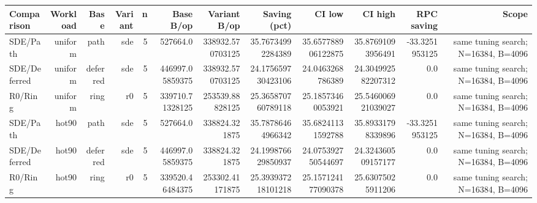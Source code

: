 \begin{tabular}{lrrrrrrrrrrr}
\toprule
Comparison & Workload & Base & Variant & n & Base B/op & Variant B/op & Saving (pct) & CI low & CI high & RPC saving & Scope \\
\midrule
SDE/Path & uniform & path & sde & 5 & 527664.0 & 338932.570703125 & 35.76734992284389 & 35.657788906122875 & 35.87691093956491 & -33.3251953125 & same tuning search; N=16384, B=4096 \\
SDE/Deferred & uniform & deferred & sde & 5 & 446997.05859375 & 338932.570703125 & 24.175659730423106 & 24.0463268786389 & 24.304992582207312 & 0.0 & same tuning search; N=16384, B=4096 \\
R0/Ring & uniform & ring & r0 & 5 & 339710.71328125 & 253539.88828125 & 25.365870760789118 & 25.18573460053921 & 25.546006921039027 & 0.0 & same tuning search; N=16384, B=4096 \\
SDE/Path & hot90 & path & sde & 5 & 527664.0 & 338824.321875 & 35.78786464966342 & 35.68241131592788 & 35.89331798339896 & -33.3251953125 & same tuning search; N=16384, B=4096 \\
SDE/Deferred & hot90 & deferred & sde & 5 & 446997.05859375 & 338824.321875 & 24.199876629850937 & 24.075392750544697 & 24.324360509157177 & 0.0 & same tuning search; N=16384, B=4096 \\
R0/Ring & hot90 & ring & r0 & 5 & 339520.46484375 & 253302.41171875 & 25.393937218101218 & 25.157124177090378 & 25.63075025911206 & 0.0 & same tuning search; N=16384, B=4096 \\
\bottomrule
\end{tabular}
